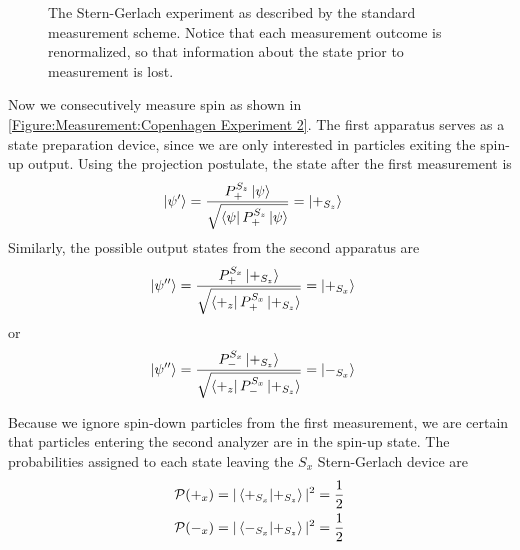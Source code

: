 \begin{figure}
\centering\CaptionFontSize
{}
\caption[Insert an abbreviated caption here to show in the List of Figures]
{The Stern-Gerlach experiment as described by the standard measurement scheme. Notice that each measurement outcome is renormalized, so that information about the state prior to measurement is lost.}
\label{Figure:Measurement:Copenhagen Experiment 2}
\end{figure}

Now we consecutively measure spin as shown in \autoref{Figure:Measurement:Copenhagen Experiment 2}. The first apparatus serves as a state preparation device, since we are only interested in particles exiting the spin-up output. Using the projection postulate, the state after the first measurement is
\begin{align}
    \ket{\psi^\prime} &= \frac{{P^{S_z}_+}\ket{\psi}}{\sqrt{\bra{\psi}P^{S_z}_+\ket{\psi}}} = \ket{+_{S_z}}
\end{align}
Similarly, the possible output states from the second apparatus are
\begin{align}
  \ket{\psi^{\prime\prime}} &= \frac{P^{S_x}_+\ket{+_{S_z}}}{\sqrt{\bra{+_z}P^{S_x}_+\ket{+_{S_z}}}} = \ket{+_{S_x}}
\end{align}
or
\begin{align}
  \ket{\psi^{\prime\prime}} &= \frac{P^{S_x}_-\ket{+_{S_z}}}{\sqrt{\bra{+_z}P^{S_x}_-\ket{+_{S_z}}}} = \ket{-_{S_x}}
\end{align}

Because we ignore spin-down particles from the first measurement, we are certain that particles entering the second analyzer are in the spin-up state. The probabilities assigned to each state leaving the $S_x$ Stern-Gerlach device are
\begin{align}
    \mathcal{P}(+_x) &= |\braket{+_{S_x}|+_{S_z}}|^2 = \frac{1}{2} \\
    \mathcal{P}(-_x) &= |\braket{-_{S_x}|+_{S_z}}|^2 = \frac{1}{2}
\end{align}

